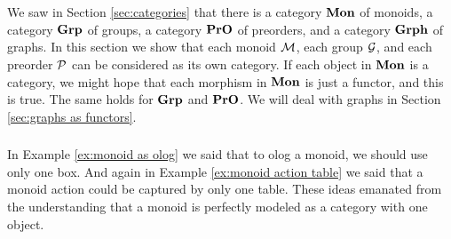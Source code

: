 \documentclass[CT4S-EN-RU]{subfiles}
\begin{document}
\section{}


\subsection{}\label{sec:mon grp pro as cat}

\begin{blockENG}
We saw in Section \ref{sec:categories} that there is a category ${\mathbf{Mon}}$ of monoids, a category ${\mathbf{Grp}}$ of groups, a category ${\mathbf{PrO}}$ of preorders, and a category ${\mathbf{Grph}}$ of graphs. In this section we show that each monoid $\mathcal{M}$, each group $\mathcal{G}$, and each preorder $\mathcal{P}$ can be considered as its own category. If each object in ${\mathbf{Mon}}$ is a category, we might hope that each morphism in ${\mathbf{Mon}}$ is just a functor, and this is true. The same holds for ${\mathbf{Grp}}$ and ${\mathbf{PrO}}$. We will deal with graphs in Section \ref{sec:graphs as functors}.
\end{blockENG}

\begin{blockRUS}
\end{blockRUS}


\subsubsection{}\label{sec:monoids as cats}

\begin{blockENG}
In Example \ref{ex:monoid as olog} we said that to olog a monoid, we should use only one box. And again in Example \ref{ex:monoid action table} we said that a monoid action could be captured by only one table. These ideas emanated from the understanding that a monoid is perfectly modeled as a category with one object. 
\end{blockENG}

\begin{blockRUS}
\end{blockRUS}

\paragraph{} ~\\
\end{document}
